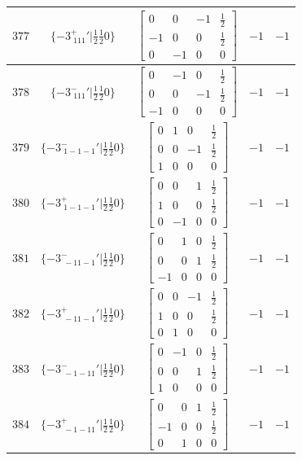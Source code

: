 \documentclass[fleqn,8pt]{jsarticle}
\begin{document}
\begin{longtable}{ccccc}
$ 377 $ & $ \{-3^{+}_{\,\,111}{}'|\frac{1}{2} \frac{1}{2} 0\} $ & $ \begin{bmatrix} 0 & 0 & -1 & \frac{1}{2} \\ -1 & 0 & 0 & \frac{1}{2} \\ 0 & -1 & 0 & 0 \end{bmatrix} $ & $ -1 $ & $ -1 $ \\ \hline
$ 378 $ & $ \{-3^{-}_{\,\,111}{}'|\frac{1}{2} \frac{1}{2} 0\} $ & $ \begin{bmatrix} 0 & -1 & 0 & \frac{1}{2} \\ 0 & 0 & -1 & \frac{1}{2} \\ -1 & 0 & 0 & 0 \end{bmatrix} $ & $ -1 $ & $ -1 $ \\ \hline
$ 379 $ & $ \{-3^{-}_{\,\,1-1-1}{}'|\frac{1}{2} \frac{1}{2} 0\} $ & $ \begin{bmatrix} 0 & 1 & 0 & \frac{1}{2} \\ 0 & 0 & -1 & \frac{1}{2} \\ 1 & 0 & 0 & 0 \end{bmatrix} $ & $ -1 $ & $ -1 $ \\ \hline
$ 380 $ & $ \{-3^{+}_{\,\,1-1-1}{}'|\frac{1}{2} \frac{1}{2} 0\} $ & $ \begin{bmatrix} 0 & 0 & 1 & \frac{1}{2} \\ 1 & 0 & 0 & \frac{1}{2} \\ 0 & -1 & 0 & 0 \end{bmatrix} $ & $ -1 $ & $ -1 $ \\ \hline
$ 381 $ & $ \{-3^{-}_{\,\,-11-1}{}'|\frac{1}{2} \frac{1}{2} 0\} $ & $ \begin{bmatrix} 0 & 1 & 0 & \frac{1}{2} \\ 0 & 0 & 1 & \frac{1}{2} \\ -1 & 0 & 0 & 0 \end{bmatrix} $ & $ -1 $ & $ -1 $ \\ \hline
$ 382 $ & $ \{-3^{+}_{\,\,-11-1}{}'|\frac{1}{2} \frac{1}{2} 0\} $ & $ \begin{bmatrix} 0 & 0 & -1 & \frac{1}{2} \\ 1 & 0 & 0 & \frac{1}{2} \\ 0 & 1 & 0 & 0 \end{bmatrix} $ & $ -1 $ & $ -1 $ \\ \hline
$ 383 $ & $ \{-3^{-}_{\,\,-1-11}{}'|\frac{1}{2} \frac{1}{2} 0\} $ & $ \begin{bmatrix} 0 & -1 & 0 & \frac{1}{2} \\ 0 & 0 & 1 & \frac{1}{2} \\ 1 & 0 & 0 & 0 \end{bmatrix} $ & $ -1 $ & $ -1 $ \\ \hline
$ 384 $ & $ \{-3^{+}_{\,\,-1-11}{}'|\frac{1}{2} \frac{1}{2} 0\} $ & $ \begin{bmatrix} 0 & 0 & 1 & \frac{1}{2} \\ -1 & 0 & 0 & \frac{1}{2} \\ 0 & 1 & 0 & 0 \end{bmatrix} $ & $ -1 $ & $ -1 $ \\
\end{longtable}
\end{document}
